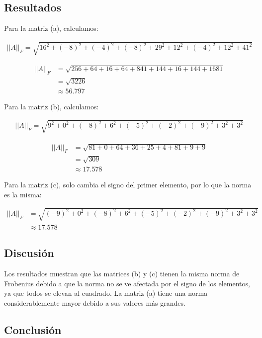 \documentclass{article}
\begin{document}
\subsection{Resultados}
\setcounter{equation}{0}

Para la matriz (a), calculamos:

\begin{align}
    ||A||_F = \sqrt{16^2 + (-8)^2 + (-4)^2 + (-8)^2 + 29^2 + 12^2 + (-4)^2 + 12^2 + 41^2}
\end{align}

\begin{align}
    ||A||_F &= \sqrt{256 + 64 + 16 + 64 + 841 + 144 + 16 + 144 + 1681} \\
    &= \sqrt{3226} \\
    &\approx 56.797
\end{align}

Para la matriz (b), calculamos:

\begin{align}
    ||A||_F = \sqrt{9^2 + 0^2 + (-8)^2 + 6^2 + (-5)^2 + (-2)^2 + (-9)^2 + 3^2 + 3^2}
\end{align}

\begin{align}
    ||A||_F &= \sqrt{81 + 0 + 64 + 36 + 25 + 4 + 81 + 9 + 9} \\
    &= \sqrt{309} \\
    &\approx 17.578
\end{align}

Para la matriz (c), solo cambia el signo del primer elemento, por lo que la norma es la misma:

\begin{align}
    ||A||_F &= \sqrt{(-9)^2 + 0^2 + (-8)^2 + 6^2 + (-5)^2 + (-2)^2 + (-9)^2 + 3^2 + 3^2} \\
    &\approx 17.578
\end{align}

\subsection{Discusión}

Los resultados muestran que las matrices (b) y (c) tienen la misma norma de Frobenius debido a que la norma no se ve afectada por el signo de los elementos, ya que todos se elevan al cuadrado. La matriz (a) tiene una norma considerablemente mayor debido a sus valores más grandes.

\subsection{Conclusión}
\end{document}
